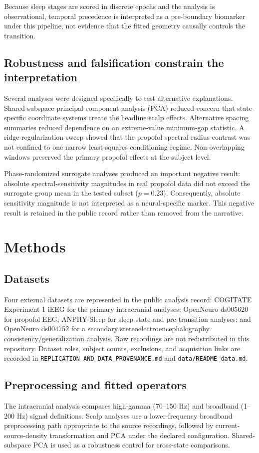 \documentclass[preprint,12pt,nonatbib]{elsarticle}
\begin{document}
Because sleep stages are scored in discrete epochs and the analysis is observational, temporal precedence is interpreted as a pre-boundary biomarker under this pipeline, not evidence that the fitted geometry causally controls the transition.

\subsection{Robustness and falsification constrain the interpretation}
Several analyses were designed specifically to test alternative explanations. Shared-subspace principal component analysis (PCA) reduced concern that state-specific coordinate systems create the headline scalp effects. Alternative spacing summaries reduced dependence on an extreme-value minimum-gap statistic. A ridge-regularization sweep showed that the propofol spectral-radius contrast was not confined to one narrow least-squares conditioning regime. Non-overlapping windows preserved the primary propofol effects at the subject level.

Phase-randomized surrogate analyses produced an important negative result: absolute spectral-sensitivity magnitudes in real propofol data did not exceed the surrogate group mean in the tested subset ($p=0.23$). Consequently, absolute sensitivity magnitude is not interpreted as a neural-specific marker. This negative result is retained in the public record rather than removed from the narrative.

\section{Methods}

\subsection{Datasets}
Four external datasets are represented in the public analysis record: COGITATE Experiment 1 iEEG for the primary intracranial analyses; OpenNeuro ds005620 for propofol EEG; ANPHY-Sleep for sleep-state and pre-transition analyses; and OpenNeuro ds004752 for a secondary stereoelectroencephalography consistency/generalization analysis. Raw recordings are not redistributed in this repository. Dataset roles, subject counts, exclusions, and acquisition links are recorded in \texttt{REPLICATION\_AND\_DATA\_PROVENANCE.md} and \texttt{data/README\_data.md}.

\subsection{Preprocessing and fitted operators}
The intracranial analysis compares high-gamma (70--150 Hz) and broadband (1--200 Hz) signal definitions. Scalp analyses use a lower-frequency broadband preprocessing path appropriate to the source recordings, followed by current-source-density transformation and PCA under the declared configuration. Shared-subspace PCA is used as a robustness control for cross-state comparisons.
\end{document}
